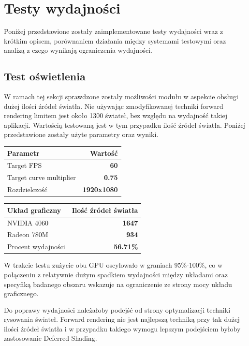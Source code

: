 \chapter{Testy wydajności}
Poniżej przedstawione zostały zaimplementowane testy wydajności wraz z krótkim opisem, porównaniem działania między systemami testowymi oraz analizą z czego wynikają ograniczenia wydajności.

\section{Test oświetlenia}
W ramach tej sekcji sprawdzone zostały możliwości modułu w aspekcie obsługi dużej ilości źródeł światła. Nie używając zmodyfikowanej techniki forward rendering limitem jest około 1300 świateł, bez względu na wydajność takiej aplikacji. Wartością testowaną jest w tym przypadku ilość źródeł światła. Poniżej przedstawione zostały użyte parametry oraz wyniki.

\begin{center}
	\begin{tabular}{ |l r|}
		\hline
		\textbf{Parametr} & \textbf{Wartość} \\
		\hline
		Target FPS & \textbf{60} \\
		Target curve multiplier & \textbf{0.75} \\
		Rozdzielczość & \textbf{1920x1080} \\
		\hline
	\end{tabular}
	\quad
	\begin{tabular}{ |l r|}
		\hline
		\textbf{Układ graficzny} & \textbf{Ilość źródeł światła} \\
		\hline
		NVIDIA 4060 & \textbf{1647} \\
		Radeon 780M & \textbf{934} \\
		\hline
		Procent wydajności & \textbf{56.71\%} \\
		\hline
	\end{tabular}
\end{center}

W trakcie testu zużycie obu GPU oscylowało w graniach 95\%-100\%, co w połączeniu z relatywnie dużym spadkiem wydajności między układami oraz specyfiką badanego obszaru wskazuje na ograniczenie ze strony mocy układu graficznego. 

Do poprawy wydajności należałoby podejść od strony optymalizacji techniki rysowania świateł. Forward rendering nie jest najlepszą techniką przy tak dużej ilości źródeł światła i w przypadku takiego wymogu lepszym podejściem byłoby zastosowanie Deferred Shading. 

